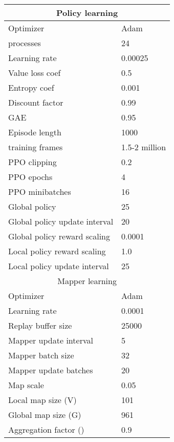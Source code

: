 \documentclass[runningheads]{llncs}
\begin{document}
\begin{table}[ht!]
\centering
\begin{tabular}{@{}ll@{}}
\toprule
\multicolumn{2}{c}{Policy learning}                             \\ \midrule
Optimizer                          & Adam~\cite{kingma2014adam} \\
 processes                     & 24                         \\
Learning rate                      & 0.00025                    \\
Value loss coef                    & 0.5                        \\
Entropy coef                       & 0.001                      \\
Discount factor            & 0.99                       \\
GAE                          & 0.95                       \\
Episode length                     & 1000                       \\
 training frames               & 1.5-2 million              \\
PPO clipping                       & 0.2                        \\
PPO epochs                         & 4                          \\
 PPO minibatches               & 16                         \\
Global policy              & 25                         \\
Global policy update interval      & 20                         \\
Global policy reward scaling       & 0.0001                     \\
Local  policy reward scaling       & 1.0                        \\
Local policy update interval       & 25                         \\
\midrule
\multicolumn{2}{c}{Mapper learning}                             \\ \midrule
Optimizer                          & Adam~\cite{kingma2014adam} \\
Learning rate                      & 0.0001                     \\
Replay buffer size                 & 25000                      \\
Mapper update interval             & 5                          \\
Mapper batch size                  & 32                         \\
Mapper update batches              & 20                         \\
Map scale                          & 0.05               \\
Local map size (V)                 & 101                        \\
Global map size (G)                & 961                        \\
Aggregation factor ()  & 0.9                        \\


\end{tabular}
\end{table}
\end{document}
